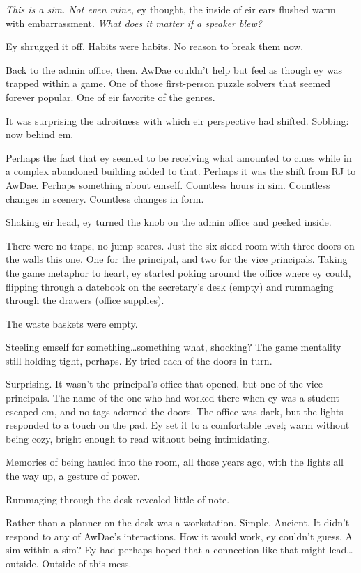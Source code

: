 \emph{This is a sim. Not even mine,} ey thought, the inside of eir ears flushed warm with embarrassment. \emph{What does it matter if a speaker blew?}

Ey shrugged it off. Habits were habits. No reason to break them now.

Back to the admin office, then. AwDae couldn't help but feel as though ey was trapped within a game. One of those first-person puzzle solvers that seemed forever popular. One of eir favorite of the genres.

It was surprising the adroitness with which eir perspective had shifted. Sobbing: now behind em.

Perhaps the fact that ey seemed to be receiving what amounted to clues while in a complex abandoned building added to that. Perhaps it was the shift from RJ to AwDae. Perhaps something about emself. Countless hours in sim. Countless changes in scenery. Countless changes in form.

Shaking eir head, ey turned the knob on the admin office and peeked inside.

There were no traps, no jump-scares. Just the six-sided room with three doors on the walls this one. One for the principal, and two for the vice principals. Taking the game metaphor to heart, ey started poking around the office where ey could, flipping through a datebook on the secretary's desk (empty) and rummaging through the drawers (office supplies).

The waste baskets were empty.

Steeling emself for something\ldots{}something what, shocking? The game mentality still holding tight, perhaps. Ey tried each of the doors in turn.

Surprising. It wasn't the principal's office that opened, but one of the vice principals. The name of the one who had worked there when ey was a student escaped em, and no tags adorned the doors. The office was dark, but the lights responded to a touch on the pad. Ey set it to a comfortable level; warm without being cozy, bright enough to read without being intimidating.

Memories of being hauled into the room, all those years ago, with the lights all the way up, a gesture of power.

Rummaging through the desk revealed little of note.

Rather than a planner on the desk was a workstation. Simple. Ancient. It didn't respond to any of AwDae's interactions. How it would work, ey couldn't guess. A sim within a sim? Ey had perhaps hoped that a connection like that might lead\ldots{}outside. Outside of this mess.

